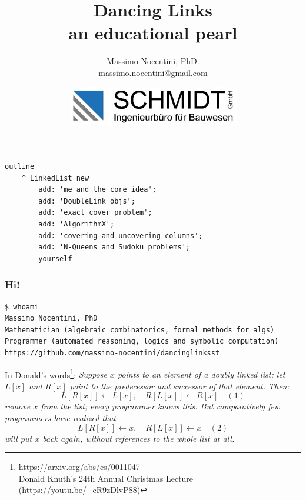 \documentclass[10pt]{beamer}
\title{Dancing Links\\\small{an educational pearl}}
\author{Massimo Nocentini, PhD.\\\footnotesize{massimo.nocentini@gmail.com}}
\institute{ESUG2019 -- \today.}
\date{\vspace{0.5cm}\includegraphics{SchmidtLogo.jpg}}
\begin{document}
\frame{\titlepage}


\begin{frame}[fragile]
\frametitle{}
\begin{verbatim}
outline
    ^ LinkedList new
        add: 'me and the core idea';
        add: 'DoubleLink objs';
        add: 'exact cover problem';
        add: 'AlgorithmX';
        add: 'covering and uncovering columns';
        add: 'N-Queens and Sudoku problems';
        yourself
\end{verbatim}
\end{frame}

\begin{frame}[fragile]
\frametitle{Hi!}
\begin{Verbatim}[fontsize=\small]
$ whoami
Massimo Nocentini, PhD
Mathematician (algebraic combinatorics, formal methods for algs)
Programmer (automated reasoning, logics and symbolic computation)
https://github.com/massimo-nocentini/dancinglinksst
\end{Verbatim}
\vfill
In Donald's words\footnote{\url{https://arxiv.org/abs/cs/0011047}\\Donald Knuth's 24th Annual Christmas Lecture (\url{https://youtu.be/_cR9zDlvP88})}:
\emph{
Suppose $x$ points to an element of a doubly linked list;
let $L[x]$ and $R[x]$ point to the predecessor and successor
of that element. Then:
\begin{displaymath}
  L[R[x]] \leftarrow L[x],\quad R[L[x]] \leftarrow R[x] \quad(1)
\end{displaymath}
remove $x$ from the list; every programmer knows this.
But comparatively few programmers have realized that
\begin{displaymath}
  L[R[x]] \leftarrow x,\quad R[L[x]] \leftarrow x \quad(2)
\end{displaymath}
will put $x$ back again, without references to the whole list at all.
}

\end{frame}
\end{document}
